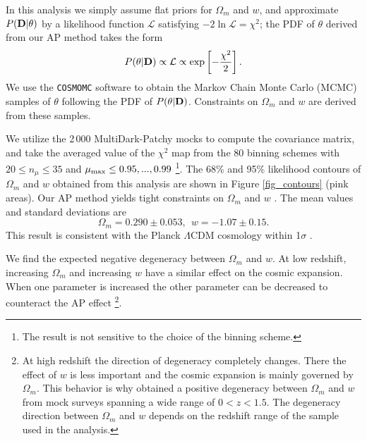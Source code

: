 \documentclass[iop]{emulateapj}
\begin{document}
In this analysis we simply assume flat priors for $\Omega_m$ and $w$,
and approximate $P({\bf D}|{\bf \theta})$ by a likelihood function $\mathcal{L}$
satisfying  $-2 \ln \mathcal{L}=\chi^2$;
the PDF of $\theta$ derived from our AP method takes the form
\begin{equation}
 P({\bf \theta}|{\bf D}) \propto \mathcal{L} \propto \exp\left[-\frac{\chi^2}{2}\right].
\end{equation}
We use the {\texttt {COSMOMC}} software \citep{LB2002}
to obtain the Markov Chain Monte Carlo (MCMC) samples of $\theta$ following the PDF of $P({\bf \theta}|{\bf D})$.
Constraints on $\Omega_m$ and $w$ are derived from these samples.

We utilize the 2\,000 MultiDark-Patchy mocks to compute the covariance matrix, 
and take the averaged value of the $\chi^2$ map from
the 80 binning schemes with $20\leq n_\mu \leq 35$ 
and $\mu_{\rm max}\leq 0.95, ..., 0.99$
\footnote{The result is not sensitive to the choice of the binning scheme.}. 
The 68\% and 95\% likelihood contours of $\Omega_m$ and $w$ 
obtained from this analysis are shown in Figure \ref{fig_contours} (pink areas).
Our AP method yields tight constraints on $\Omega_m$ and $w$ .
The mean values and standard deviations are
\begin{equation}
 \Omega_m=0.290 \pm 0.053,\          \ w = -1.07 \pm 0.15. %
\end{equation}
This result is consistent with the Planck $\Lambda$CDM cosmology within 1$\sigma$ \citep{Planck2015}.



We find the expected negative degeneracy between $\Omega_m$ and $w$.
At low redshift, increasing $\Omega_m$ and increasing $w$ have a similar effect on the cosmic expansion.
When one parameter is increased the other parameter can be decreased to counteract the AP effect
\footnote{At high redshift the direction of degeneracy completely changes. 
There the effect of $w$ is less important and the cosmic expansion is mainly governed by $\Omega_m$.
This behavior is why \cite{Li2015} obtained a positive degeneracy between $\Omega_m$ and $w$ from mock surveys 
spanning a wide range of $0< z < 1.5$.
The degeneracy direction between $\Omega_m$ and $w$ depends on the redshift range of the sample used in the analysis.}.
\end{document}
